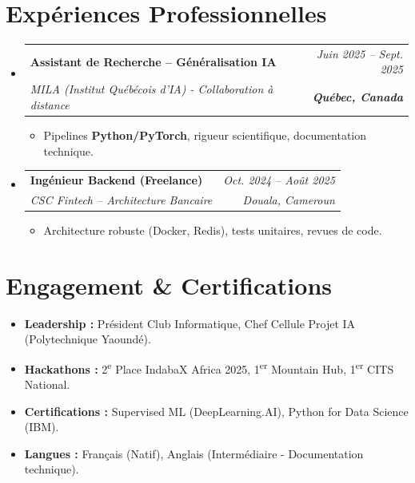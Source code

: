 \documentclass[a4paper,11pt]{article}
\makeatletter
\newcommand{\resumeSubheading}[4]{
  \vspace{-1pt}\item
    \begin{tabular*}{0.97\textwidth}[t]{l@{\extracolsep{\fill}}r}
      \textbf{#1} & \textit{\small #2} \\
      \textit{\small #3} & \textit{\small #4} \\
    \end{tabular*}\vspace{-5pt}
}
\makeatother
\begin{document}
\section{Expériences Professionnelles}
\begin{itemize}[leftmargin=*, label={}]

    \resumeSubheading
      {Assistant de Recherche -- Généralisation IA}{Juin 2025 -- Sept. 2025}
      {MILA (Institut Québécois d'IA) - Collaboration à distance}{\textbf{Québec, Canada}}
      \begin{itemize}[leftmargin=0.4cm, nosep, label=\tiny$\bullet$]
        \item \small{Pipelines \textbf{Python/PyTorch}, rigueur scientifique, documentation technique.}
      \end{itemize}
    \vspace{2pt}

    \resumeSubheading
      {Ingénieur Backend (Freelance)}{Oct. 2024 -- Août 2025}
      {CSC Fintech -- Architecture Bancaire}{Douala, Cameroun}
      \begin{itemize}[leftmargin=0.4cm, nosep, label=\tiny$\bullet$]
        \item \small{Architecture robuste (Docker, Redis), tests unitaires, revues de code.}
      \end{itemize}
\end{itemize}

\section{Engagement \& Certifications}
\begin{itemize}[leftmargin=*, nosep]
    \item \textbf{Leadership :} Président Club Informatique, Chef Cellule Projet IA (Polytechnique Yaoundé).
    \item \textbf{Hackathons :} 2\textsuperscript{e} Place IndabaX Africa 2025, 1\textsuperscript{er} Mountain Hub, 1\textsuperscript{er} CITS National.
    \item \textbf{Certifications :} Supervised ML (DeepLearning.AI), Python for Data Science (IBM).
    \item \textbf{Langues :} Français (Natif), Anglais (Intermédiaire - Documentation technique).
\end{itemize}
\end{document}
